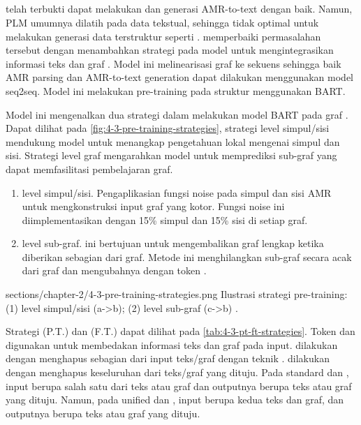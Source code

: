 \subsection{ }

 telah terbukti dapat melakukan  \amrparsing{} dan generasi AMR-to-text dengan baik.
Namun, \gls{PLM} umumnya dilatih pada data tekstual, sehingga tidak optimal untuk melakukan generasi data terstruktur seperti \AMR{}.
\textcite{bai2022} memperbaiki permasalahan tersebut dengan menambahkan strategi \pretraining{} pada model untuk mengintegrasikan informasi teks dan graf \AMR{}.
Model ini melinearisasi graf \AMR{} ke sekuens sehingga baik AMR parsing dan AMR-to-text generation dapat dilakukan menggunakan model \gls{seq2seq}.
Model ini melakukan pre-training pada struktur \AMR{} menggunakan \gls{BART}.


Model ini mengenalkan dua strategi  dalam melakukan \pretraining{} model \gls{BART} pada graf \AMR{}.
Dapat dilihat pada \cref{fig:4-3-pre-training-strategies}, strategi level \denoising{} simpul/sisi mendukung model untuk menangkap pengetahuan lokal mengenai simpul dan sisi.
Strategi \denoising{} level graf mengarahkan model untuk memprediksi sub-graf yang dapat memfasilitasi pembelajaran graf.
\begin{enumerate}
  \item \Denoising{} level simpul/sisi.
  Pengaplikasian fungsi noise pada simpul dan sisi AMR untuk mengkonstruksi input graf yang kotor.
  Fungsi noise ini diimplementasikan dengan  15\% simpul dan 15\% sisi di setiap graf.

  \item \Denoising{} level sub-graf.
   ini bertujuan untuk mengembalikan graf lengkap ketika diberikan sebagian dari graf.
  Metode ini menghilangkan sub-graf secara acak dari graf dan mengubahnya dengan token .
\end{enumerate}

  {sections/chapter-2/4-3-pre-training-strategies.png}
  {Ilustrasi strategi pre-training: (1) \denoising{} level simpul/sisi (a->b); (2) \denoising{} level sub-graf (c->b) .}

Strategi \pretraining{} (P.T.) dan \finetuning{} (F.T.) dapat dilihat pada \cref{tab:4-3-pt-ft-strategies}.
Token  dan  digunakan untuk membedakan informasi teks dan graf pada input.
\Pretraining{} dilakukan dengan menghapus sebagian dari input teks/graf dengan teknik \denoising{}.
\Finetuning{} dilakukan dengan menghapus keseluruhan dari teks/graf yang dituju.
Pada standard \pretraining{} dan \finetuning{}, input berupa salah satu dari teks atau graf dan outputnya berupa teks atau graf yang dituju.
Namun, pada unified \pretraining{} dan \finetuning{}, input berupa kedua teks dan graf, dan outputnya berupa teks atau graf yang dituju.

